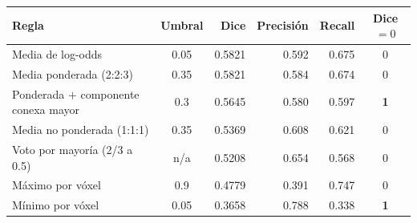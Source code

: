 \begin{tabular}{lcrrrc}
\toprule
Regla & Umbral & Dice & Precisión & Recall & Dice $=0$ \\
\midrule
Media de log-odds & 0.05 & 0.5821 & 0.592 & 0.675 & 0 \\
Media ponderada (2:2:3) & 0.35 & 0.5821 & 0.584 & 0.674 & 0 \\
Ponderada $+$ componente conexa mayor & 0.3 & 0.5645 & 0.580 & 0.597 & \bfseries 1 \\
Media no ponderada (1:1:1) & 0.35 & 0.5369 & 0.608 & 0.621 & 0 \\
Voto por mayoría (2/3 a 0.5) & n/a & 0.5208 & 0.654 & 0.568 & 0 \\
Máximo por vóxel & 0.9 & 0.4779 & 0.391 & 0.747 & 0 \\
Mínimo por vóxel & 0.05 & 0.3658 & 0.788 & 0.338 & \bfseries 1 \\
\bottomrule
\end{tabular}%